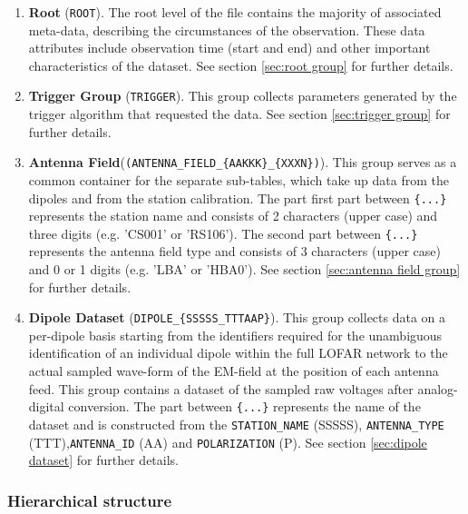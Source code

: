 \documentclass[a4paper,10pt,bibtotoc]{scrartcl}
\begin{document}
\begin{enumerate}
\item \textbf{Root} (\verb|ROOT|). The root level of the file contains the
  majority of associated meta-data, describing the circumstances of
  the observation. These data attributes include observation time
  (start and end) and other important characteristics of the dataset. See
  section \ref{sec:root group} for further details.
\item \textbf{Trigger Group} (\verb|TRIGGER|). This
  group collects parameters generated by the trigger
  algorithm that requested the data. See section \ref{sec:trigger group} for further
  details.
\item \textbf{Antenna Field}(\verb|(ANTENNA_FIELD_{AAKKK}_{XXXN})|). This group serves as a
  common container for the separate sub-tables, which take up data from the dipoles and from the station calibration.
  The part first part between \verb|{...}| represents the station name and consists of 2
  characters (upper case) and three digits (e.g. 'CS001' or 'RS106'). The second part between \verb|{...}| represents the antenna field type and consists of 3 characters (upper case) and 0 or 1 digits (e.g. 'LBA' or 'HBA0'). 
  See section \ref{sec:antenna field group} for further details.
\item \textbf{Dipole Dataset} (\verb|DIPOLE_{SSSSS_TTTAAP}|). This group
  collects data on a per-dipole basis starting from the identifiers required for
  the unambiguous identification of an individual dipole within the full LOFAR
  network to the actual sampled wave-form of the EM-field at the position of
  each antenna feed. This group contains a dataset of the sampled raw voltages after analog-digital conversion.
  The part between \verb|{...}| represents the name of the dataset and is
  constructed from the \small \texttt{STATION\_NAME} (SSSSS), \verb|ANTENNA_TYPE| (TTT),\verb|ANTENNA_ID|
  (AA) and \verb|POLARIZATION| (P).
  See section \ref{sec:dipole dataset} for further details.
\end{enumerate}




\subsubsection{Hierarchical structure}
\label{sec:hierarchical structure}
\end{document}
